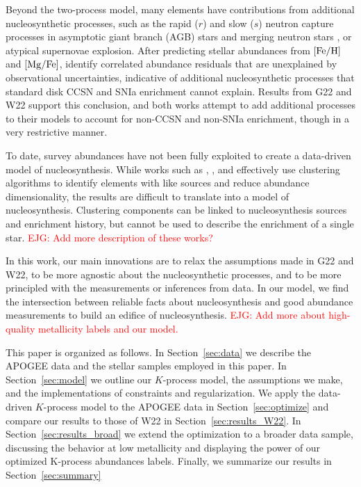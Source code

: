 \documentclass[modern]{aastex631}
\newcommand{\mgfe}[0]{[{\rm Mg/Fe}]}
\newcommand{\feh}[0]{[{\rm Fe/H}]}
\newcommand{\ejg}[1]{\textcolor{red}{EJG: #1}}
\begin{document}
Beyond the two-process model, many elements have contributions from additional nucleosynthetic processes, such as the rapid ($r$) and slow ($s$) neutron capture processes \citep{arlandini1999, bisterzo2014} in asymptotic giant branch (AGB) stars \citep[e.g.,][]{simmerer2004, karakas2016} and merging neutron stars \citep{kilpatrick2017}, or atypical supernovae explosion. After predicting stellar abundances from $\feh$ and $\mgfe$, \citet{ting2022} identify correlated abundance residuals that are unexplained by observational uncertainties, indicative of additional nucleosynthetic processes that standard disk CCSN and SNIa enrichment cannot explain. Results from G22 and W22 support this conclusion, and both works attempt to add additional processes to their models to account for non-CCSN and non-SNIa enrichment, though in a very restrictive manner.

To date, survey abundances have not been fully exploited to create a data-driven model of nucleosynthesis. While works such as \citet{ting2012}, \citet{casey2019}, and \citet{ratcliffe2022} effectively use clustering algorithms to identify elements with like sources and reduce abundance dimensionality, the results are difficult to translate into a model of nucleosynthesis. Clustering components can be linked to nucleosynthesis sources and enrichment history, but cannot be used to describe the enrichment of a single star.
\ejg{Add more description of these works?}

In this work, our main innovations are to relax the assumptions made in G22 and W22, to be more agnostic about the nucleosynthetic processes, and to be more principled with the measurements or inferences from data. In our model, we find the intersection between reliable facts about nucleosynthesis and good abundance measurements to build an edifice of nucleosynthesis.  \ejg{Add more about high-quality metallicity labels and our model.} 

This paper is organized as follows. In Section~\ref{sec:data} we describe the APOGEE data and the stellar samples employed in this paper. In Section~\ref{sec:model} we outline our $K$-process model, the assumptions we make, and the implementations of constraints and regularization. We apply the data-driven $K$-process model to the APOGEE data in Section~\ref{sec:optimize} and compare our results to those of W22 in Section~\ref{sec:results_W22}. In Section~\ref{sec:results_broad} we extend the optimization to a broader data sample, discussing the behavior at low metallicity and displaying the power of our optimized K-process abundances labels. Finally, we summarize our results in Section~\ref{sec:summary}
\end{document}

